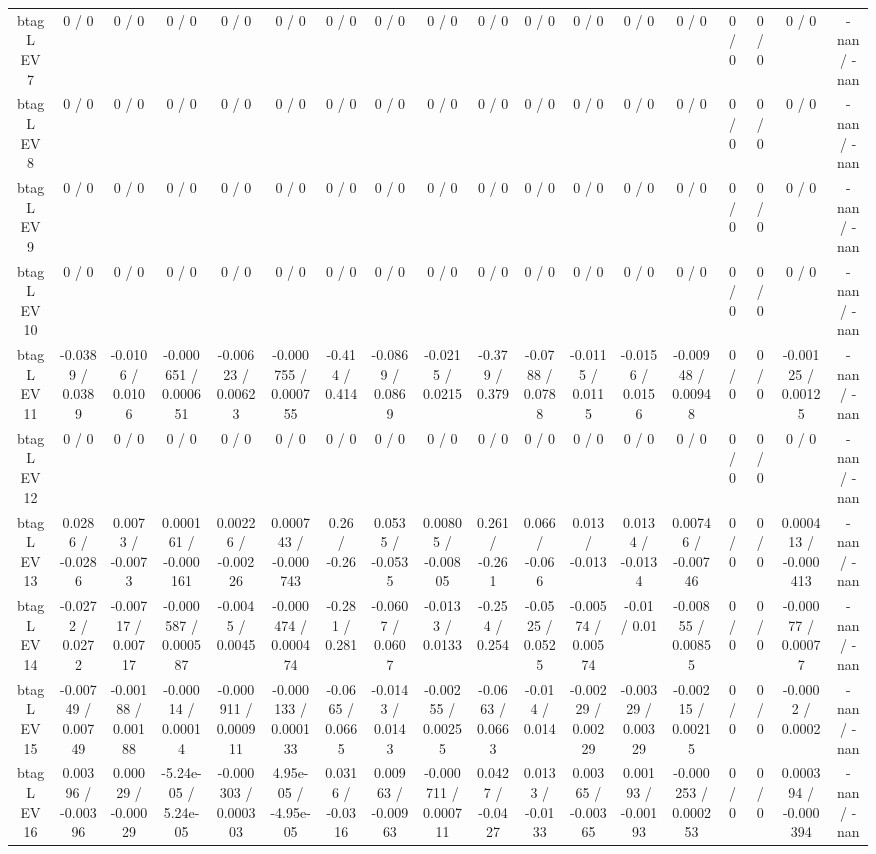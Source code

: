 \documentclass[10pt]{article}
\begin{document}
\begin{table}[htbp]
\begin{center}
\begin{tabular}{|c|c|c|c|c|c|c|c|c|c|c|c|c|c|c|c|c|c|}
  btag L EV 7 & 0 / 0 & 0 / 0 & 0 / 0 & 0 / 0 & 0 / 0 & 0 / 0 & 0 / 0 & 0 / 0 & 0 / 0 & 0 / 0 & 0 / 0 & 0 / 0 & 0 / 0 & 0 / 0 & 0 / 0 & 0 / 0 & -nan / -nan \\ 
  btag L EV 8 & 0 / 0 & 0 / 0 & 0 / 0 & 0 / 0 & 0 / 0 & 0 / 0 & 0 / 0 & 0 / 0 & 0 / 0 & 0 / 0 & 0 / 0 & 0 / 0 & 0 / 0 & 0 / 0 & 0 / 0 & 0 / 0 & -nan / -nan \\ 
  btag L EV 9 & 0 / 0 & 0 / 0 & 0 / 0 & 0 / 0 & 0 / 0 & 0 / 0 & 0 / 0 & 0 / 0 & 0 / 0 & 0 / 0 & 0 / 0 & 0 / 0 & 0 / 0 & 0 / 0 & 0 / 0 & 0 / 0 & -nan / -nan \\ 
  btag L EV 10 & 0 / 0 & 0 / 0 & 0 / 0 & 0 / 0 & 0 / 0 & 0 / 0 & 0 / 0 & 0 / 0 & 0 / 0 & 0 / 0 & 0 / 0 & 0 / 0 & 0 / 0 & 0 / 0 & 0 / 0 & 0 / 0 & -nan / -nan \\ 
  btag L EV 11 & -0.0389 / 0.0389 & -0.0106 / 0.0106 & -0.000651 / 0.000651 & -0.00623 / 0.00623 & -0.000755 / 0.000755 & -0.414 / 0.414 & -0.0869 / 0.0869 & -0.0215 / 0.0215 & -0.379 / 0.379 & -0.0788 / 0.0788 & -0.0115 / 0.0115 & -0.0156 / 0.0156 & -0.00948 / 0.00948 & 0 / 0 & 0 / 0 & -0.00125 / 0.00125 & -nan / -nan \\ 
  btag L EV 12 & 0 / 0 & 0 / 0 & 0 / 0 & 0 / 0 & 0 / 0 & 0 / 0 & 0 / 0 & 0 / 0 & 0 / 0 & 0 / 0 & 0 / 0 & 0 / 0 & 0 / 0 & 0 / 0 & 0 / 0 & 0 / 0 & -nan / -nan \\ 
  btag L EV 13 & 0.0286 / -0.0286 & 0.0073 / -0.0073 & 0.000161 / -0.000161 & 0.00226 / -0.00226 & 0.000743 / -0.000743 & 0.26 / -0.26 & 0.0535 / -0.0535 & 0.00805 / -0.00805 & 0.261 / -0.261 & 0.066 / -0.066 & 0.013 / -0.013 & 0.0134 / -0.0134 & 0.00746 / -0.00746 & 0 / 0 & 0 / 0 & 0.000413 / -0.000413 & -nan / -nan \\ 
  btag L EV 14 & -0.0272 / 0.0272 & -0.00717 / 0.00717 & -0.000587 / 0.000587 & -0.0045 / 0.0045 & -0.000474 / 0.000474 & -0.281 / 0.281 & -0.0607 / 0.0607 & -0.0133 / 0.0133 & -0.254 / 0.254 & -0.0525 / 0.0525 & -0.00574 / 0.00574 & -0.01 / 0.01 & -0.00855 / 0.00855 & 0 / 0 & 0 / 0 & -0.00077 / 0.00077 & -nan / -nan \\ 
  btag L EV 15 & -0.00749 / 0.00749 & -0.00188 / 0.00188 & -0.00014 / 0.00014 & -0.000911 / 0.000911 & -0.000133 / 0.000133 & -0.0665 / 0.0665 & -0.0143 / 0.0143 & -0.00255 / 0.00255 & -0.0663 / 0.0663 & -0.014 / 0.014 & -0.00229 / 0.00229 & -0.00329 / 0.00329 & -0.00215 / 0.00215 & 0 / 0 & 0 / 0 & -0.0002 / 0.0002 & -nan / -nan \\ 
  btag L EV 16 & 0.00396 / -0.00396 & 0.00029 / -0.00029 & -5.24e-05 / 5.24e-05 & -0.000303 / 0.000303 & 4.95e-05 / -4.95e-05 & 0.0316 / -0.0316 & 0.00963 / -0.00963 & -0.000711 / 0.000711 & 0.0427 / -0.0427 & 0.0133 / -0.0133 & 0.00365 / -0.00365 & 0.00193 / -0.00193 & -0.000253 / 0.000253 & 0 / 0 & 0 / 0 & 0.000394 / -0.000394 & -nan / -nan \\ 

\end{tabular}
\end{center}
\end{table}
\end{document}

